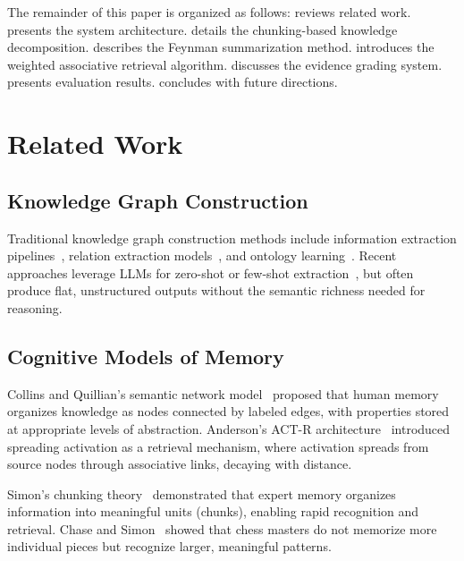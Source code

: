 \documentclass[11pt]{article}
\begin{document}
The remainder of this paper is organized as follows:  reviews related work.  presents the system architecture.  details the chunking-based knowledge decomposition.  describes the Feynman summarization method.  introduces the weighted associative retrieval algorithm.  discusses the evidence grading system.  presents evaluation results.  concludes with future directions.

\section{Related Work}
\label{sec:related}

\subsection{Knowledge Graph Construction}

Traditional knowledge graph construction methods include information extraction pipelines~\cite{banko2007open}, relation extraction models~\cite{riedel2010model}, and ontology learning~\cite{maedche2001ontology}. Recent approaches leverage LLMs for zero-shot or few-shot extraction~\cite{wei2023zero}, but often produce flat, unstructured outputs without the semantic richness needed for reasoning.

\subsection{Cognitive Models of Memory}

Collins and Quillian's semantic network model~\cite{collins1969semantic} proposed that human memory organizes knowledge as nodes connected by labeled edges, with properties stored at appropriate levels of abstraction. Anderson's ACT-R architecture~\cite{anderson1983architecture} introduced spreading activation as a retrieval mechanism, where activation spreads from source nodes through associative links, decaying with distance.

Simon's chunking theory~\cite{simon1974chunk} demonstrated that expert memory organizes information into meaningful units (chunks), enabling rapid recognition and retrieval. Chase and Simon~\cite{chase1973perception} showed that chess masters do not memorize more individual pieces but recognize larger, meaningful patterns.
\end{document}

